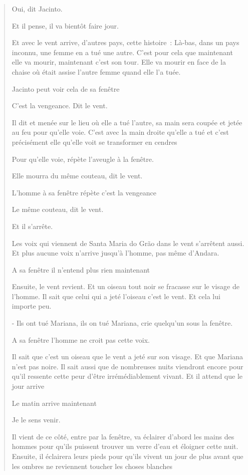 \begin{quote}
Oui, dit Jacinto.

Et il pense, il va bientôt faire jour.

Et avec le vent arrive, d'autres pays, cette histoire~: Là-bas, dans un
pays inconnu, une femme en a tué une autre. C'est pour cela que
maintenant elle va mourir, maintenant c'est son tour. Elle va mourir en
face de la chaise où était assise l'autre femme quand elle l'a tuée.

Jacinto peut voir cela de sa fenêtre

C'est la vengeance. Dit le vent.

Il dit et menée sur le lieu où elle a tué l'autre, sa main sera coupée
et jetée au feu pour qu'elle voie. C'est avec la main droite qu'elle a
tué et c'est précisément elle qu'elle voit se transformer en cendres

Pour qu'elle voie, répète l'aveugle à la fenêtre.

Elle mourra du même couteau, dit le vent.

L'homme à sa fenêtre répète c'est la vengeance

Le même couteau, dit le vent.

Et il s'arrête.

Les voix qui viennent de Santa Maria do Grão dans le vent s'arrêtent
aussi. Et plus aucune voix n'arrive jusqu'à l'homme, pas même d'Andara.

A sa fenêtre il n'entend plus rien maintenant

Ensuite, le vent revient. Et un oiseau tout noir se fracasse sur le
visage de l'homme. Il sait que celui qui a jeté l'oiseau c'est le vent.
Et cela lui importe peu.

- Ils ont tué Mariana, ils on tué Mariana, crie quelqu'un sous la
fenêtre.

A sa fenêtre l'homme ne croit pas cette voix.

Il sait que c'est un oiseau que le vent a jeté sur son visage. Et que
Mariana n'est pas noire. Il sait aussi que de nombreuses nuits viendront
encore pour qu'il ressente cette peur d'être irrémédiablement vivant. Et
il attend que le jour arrive

Le matin arrive maintenant

Je le sens venir.

Il vient de ce côté, entre par la fenêtre, va éclairer d'abord les mains
des hommes pour qu'ils puissent trouver un verre d'eau et éloigner cette
nuit. Ensuite, il éclairera leurs pieds pour qu'ils vivent un jour de
plus avant que les ombres ne reviennent toucher les choses blanches


\end{quote}
